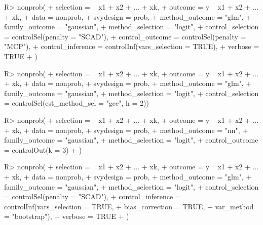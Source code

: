 \documentclass[
]{jss}
\begin{document}
\begin{CodeChunk}
\begin{CodeInput}
R> nonprob(
+   selection = ~ x1 + x2 + ... + xk, 
+   outcome = y ~ x1 + x2 + ... + xk, 
+   data = nonprob, 
+   svydesign = prob, 
+   method_outcome = "glm", 
+   family_outcome = "gaussian",
+   method_selection = "logit",
+   control_selection = controlSel(penalty = "SCAD"),
+   control_outcome = controlSel(penalty = "MCP"),
+   control_inference = controlInf(vars_selection = TRUE),
+   verbose = TRUE
+ )
\end{CodeInput}
\end{CodeChunk}

\begin{CodeChunk}
\begin{CodeInput}
R> nonprob(
+   selection = ~ x1 + x2 + ... + xk, 
+   outcome = y ~ x1 + x2 + ... + xk, 
+   data = nonprob, 
+   svydesign = prob, 
+   method_outcome = "glm", 
+   family_outcome = "gaussian",
+   method_selection = "logit",
+   control_selection = controlSel(est_method_sel = "gee", h = 2))
\end{CodeInput}
\end{CodeChunk}

\begin{CodeChunk}
\begin{CodeInput}
R> nonprob(
+   selection = ~ x1 + x2 + ... + xk, 
+   outcome = y ~ x1 + x2 + ... + xk, 
+   data = nonprob, 
+   svydesign = prob, 
+   method_outcome = "nn",
+   family_outcome = "gaussian",
+   method_selection = "logit",
+   control_outcome = controlOut(k = 3)
+ )
\end{CodeInput}
\end{CodeChunk}

\begin{CodeChunk}
\begin{CodeInput}
R> nonprob(
+   selection = ~ x1 + x2 + ... + xk, 
+   outcome = y ~ x1 + x2 + ... + xk, 
+   data = nonprob, 
+   svydesign = prob, 
+   method_outcome = "glm", 
+   family_outcome = "gaussian",
+   method_selection = "logit",
+   control_selection = controlSel(penalty = "SCAD"),
+   control_inference = controlInf(vars_selection = TRUE,
+                                  bias_correction = TRUE,
+                                  var_method = "bootstrap"),
+   verbose = TRUE
+ )
\end{CodeInput}
\end{CodeChunk}
\end{document}
